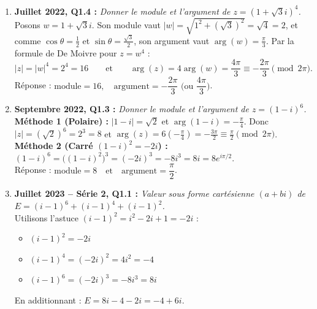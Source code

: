 \begin{exemple}
\begin{enumerate}
    \item \textbf{Juillet 2022, Q1.4 :} \emph{Donner le module et l'argument de $z = (1 + \sqrt{3}i)^4$.}\\
    Posons $w = 1 + \sqrt{3}i$. Son module vaut $|w| = \sqrt{1^2 + (\sqrt{3})^2} = \sqrt{4} = 2$, et comme $\cos\theta = \frac{1}{2}$ et $\sin\theta = \frac{\sqrt{3}}{2}$, son argument vaut $\arg(w) = \frac{\pi}{3}$.
    Par la formule de De Moivre pour $z = w^4$ :
    \[
        |z| = |w|^4 = 2^4 = 16 \qquad \text{et} \qquad \arg(z) = 4\arg(w) = \frac{4\pi}{3} \equiv -\frac{2\pi}{3} \pmod{2\pi}.
    \]
    Réponse : $\boxed{\text{module} = 16, \quad \text{argument} = -\dfrac{2\pi}{3} \text{ (ou } \dfrac{4\pi}{3}\text{)}}$.

    \item \textbf{Septembre 2022, Q1.3 :} \emph{Donner le module et l'argument de $z = (1 - i)^6$.}\\
    \textbf{Méthode 1 (Polaire) :} $|1 - i| = \sqrt{2}$ et $\arg(1 - i) = -\frac{\pi}{4}$. Donc $|z| = (\sqrt{2})^6 = 2^3 = 8$ et $\arg(z) = 6\left(-\frac{\pi}{4}\right) = -\frac{3\pi}{2} \equiv \frac{\pi}{2} \pmod{2\pi}$.\\
    \textbf{Méthode 2 (Carré $(1-i)^2 = -2i$) :} $(1 - i)^6 = \bigl((1 - i)^2\bigr)^3 = (-2i)^3 = -8i^3 = 8i = 8e^{i\pi/2}$.\\
    Réponse : $\boxed{\text{module} = 8 \quad \text{et} \quad \text{argument} = \dfrac{\pi}{2}}$.

    \item \textbf{Juillet 2023 -- Série 2, Q1.1 :} \emph{Valeur sous forme cartésienne $(a + bi)$ de $E = (i - 1)^6 + (i - 1)^4 + (i - 1)^2$.}\\
    Utilisons l'astuce $(i - 1)^2 = i^2 - 2i + 1 = -2i$ :
    \begin{itemize}
        \item $(i - 1)^2 = -2i$
        \item $(i - 1)^4 = (-2i)^2 = 4i^2 = -4$
        \item $(i - 1)^6 = (-2i)^3 = -8i^3 = 8i$
    \end{itemize}
    En additionnant : $E = 8i - 4 - 2i = \boxed{-4 + 6i}$.


\end{enumerate}
\end{exemple}
